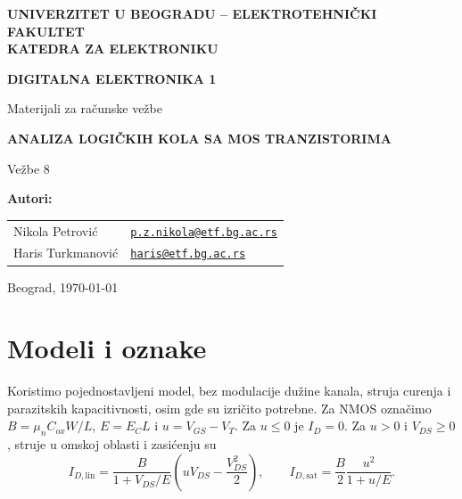 \documentclass[a4paper,11pt]{article}
\numberwithin{equation}{section}
\begin{document}
\hypersetup{pageanchor=false}
\begin{titlepage}
\thispagestyle{empty}
\begin{center}
{\Large\bfseries UNIVERZITET U BEOGRADU -- ELEKTROTEHNIČKI FAKULTET\\ KATEDRA ZA ELEKTRONIKU\par}
\vspace{25mm}
{\LARGE\bfseries DIGITALNA ELEKTRONIKA 1\par}
\vspace{2mm}
{\large Materijali za računske vežbe\par}
\vspace{18mm}
{\Large\bfseries ANALIZA LOGIČKIH KOLA SA MOS TRANZISTORIMA\par}
\vspace{3mm}
{\large Vežbe 8\par}
\vfill
\begin{minipage}{0.62\linewidth}
\raggedright\textbf{Autori:}\\[4pt]\small
\begin{tabular}{@{}ll@{}}
Nikola Petrović & \href{mailto:p.z.nikola@etf.bg.ac.rs}{\texttt{p.z.nikola@etf.bg.ac.rs}}\\
Haris Turkmanović & \href{mailto:haris@etf.bg.ac.rs}{\texttt{haris@etf.bg.ac.rs}}\\
\end{tabular}
\end{minipage}\hfill
\begin{minipage}{0.34\linewidth}\raggedleft Beograd, \today\end{minipage}
\end{center}
\end{titlepage}
\hypersetup{pageanchor=true}
\tableofcontents
\newpage
\section*{Modeli i oznake}
Koristimo pojednostavljeni model, bez modulacije dužine kanala, struja curenja i parazitskih kapacitivnosti, osim gde su izričito potrebne. Za NMOS označimo $B=\mu_nC_{ox}W/L$, $E=E_C L$ i $u=V_{GS}-V_T$. Za $u\le0$ je $I_D=0$. Za $u>0$ i $V_{DS}\ge0$, struje u omskoj oblasti i zasićenju su
\begin{equation}\label{eq:model}
I_{D,\mathrm{lin}}=\frac{B}{1+V_{DS}/E}\left(uV_{DS}-\frac{V_{DS}^2}{2}\right),\qquad I_{D,\mathrm{sat}}=\frac{B}{2}\frac{u^2}{1+u/E}.
\end{equation}
\end{document}
